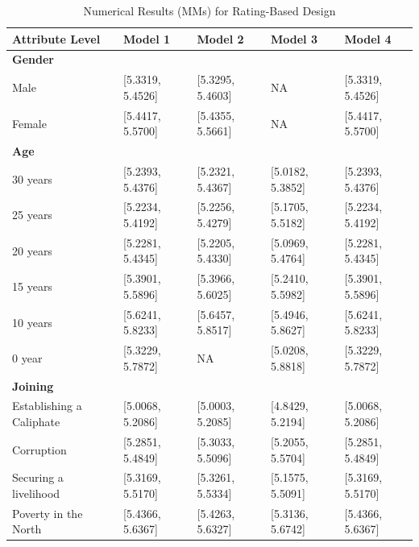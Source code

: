 \begin{table}[H]
\footnotesize
\setlength{\tabcolsep}{5pt}
\begin{threeparttable}
\caption{Numerical Results (MMs) for Rating-Based Design}
\label{tab:art2-app-tab6}
\begin{tabular}{lllll}
\toprule
\midrule
Attribute Level & Model 1                   & Model 2               & Model 3               & Model 4 \\ [0.9ex]
\midrule
\textbf{Gender} \\  
Male    & [5.3319, 5.4526]                  & [5.3295, 5.4603]      & NA                    & [5.3319, 5.4526]  \\ 
Female  & [5.4417, 5.5700]                  & [5.4355, 5.5661]      & NA                    & [5.4417, 5.5700] \\ [0.9ex]
\textbf{Age} \\  
30 years & [5.2393, 5.4376]                 & [5.2321, 5.4367]      & [5.0182, 5.3852]      & [5.2393, 5.4376]  \\ 
25 years & [5.2234, 5.4192]                 & [5.2256, 5.4279]      & [5.1705, 5.5182]      & [5.2234, 5.4192] \\ 
20 years & [5.2281, 5.4345]                 & [5.2205, 5.4330]      & [5.0969, 5.4764]      & [5.2281, 5.4345] \\ 
15 years & [5.3901, 5.5896]                 & [5.3966, 5.6025]      & [5.2410, 5.5982]      & [5.3901, 5.5896] \\ 
10 years & [5.6241, 5.8233]                 & [5.6457, 5.8517]      & [5.4946, 5.8627]      & [5.6241, 5.8233] \\ 
0 year   & [5.3229, 5.7872]                 & NA                    & [5.0208, 5.8818]      & [5.3229, 5.7872]\\ [0.9ex]
\textbf{Joining} \\  
Establishing a Caliphate & [5.0068, 5.2086]     & [5.0003, 5.2085]      & [4.8429, 5.2194]      & [5.0068, 5.2086]  \\ 
Corruption              & [5.2851, 5.4849]      & [5.3033, 5.5096]      & [5.2055, 5.5704]      & [5.2851, 5.4849]\\ 
Securing a livelihood   & [5.3169, 5.5170]      & [5.3261, 5.5334]      & [5.1575, 5.5091]      & [5.3169, 5.5170]\\
Poverty in the North    & [5.4366, 5.6367]      & [5.4263, 5.6327]      & [5.3136, 5.6742]      & [5.4366, 5.6367] \\ 

\end{tabular}
\end{threeparttable}
\end{table}
